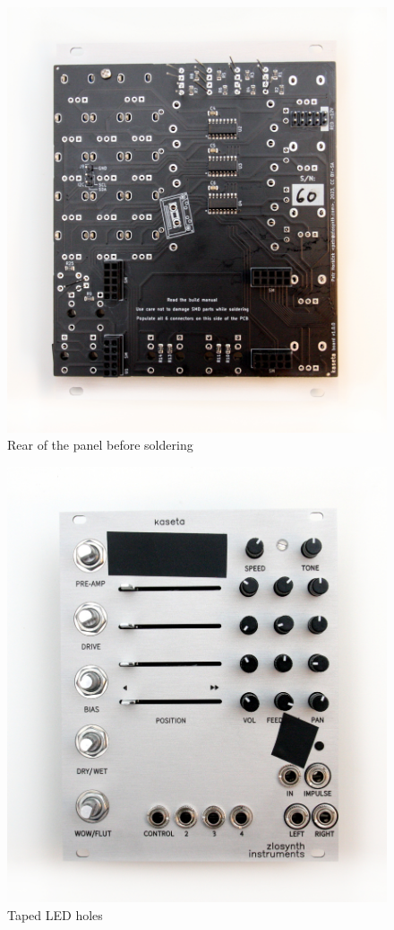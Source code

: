 \documentclass[10pt,a4paper,twocolumn]{article}
\begin{document}
\begin{figure}[h]
  \centering
  \includegraphics[width=\linewidth]{p04.jpg}
  \caption{Rear of the panel before soldering}
  \label{Before soldering}
\end{figure}

\begin{figure}[h]
  \centering
  \includegraphics[width=\linewidth]{p05.jpg}
  \caption{Taped LED holes}
  \label{masking}
\end{figure}
\end{document}
